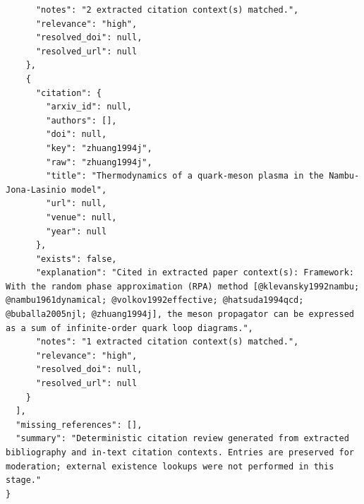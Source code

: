 \documentclass[11pt]{article}
\begin{document}
\begin{verbatim}
      "notes": "2 extracted citation context(s) matched.",
      "relevance": "high",
      "resolved_doi": null,
      "resolved_url": null
    },
    {
      "citation": {
        "arxiv_id": null,
        "authors": [],
        "doi": null,
        "key": "zhuang1994j",
        "raw": "zhuang1994j",
        "title": "Thermodynamics of a quark-meson plasma in the Nambu-Jona-Lasinio model",
        "url": null,
        "venue": null,
        "year": null
      },
      "exists": false,
      "explanation": "Cited in extracted paper context(s): Framework: With the random phase approximation (RPA) method [@klevansky1992nambu; @nambu1961dynamical; @volkov1992effective; @hatsuda1994qcd; @buballa2005njl; @zhuang1994j], the meson propagator can be expressed as a sum of infinite-order quark loop diagrams.",
      "notes": "1 extracted citation context(s) matched.",
      "relevance": "high",
      "resolved_doi": null,
      "resolved_url": null
    }
  ],
  "missing_references": [],
  "summary": "Deterministic citation review generated from extracted bibliography and in-text citation contexts. Entries are preserved for moderation; external existence lookups were not performed in this stage."
}
\end{verbatim}
\end{document}
